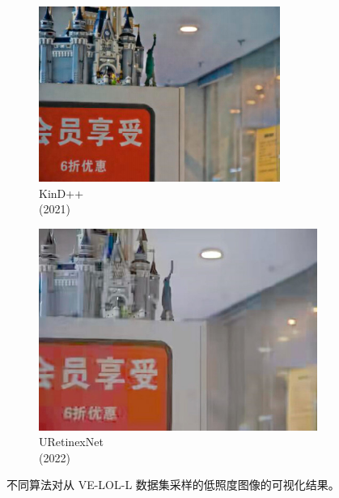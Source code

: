 \documentclass[a4paper, 10pt]{article}
\begin{document}
\begin{figure}[htbp]
\begin{subfigure}{0.17\columnwidth}
			\includegraphics[width=\linewidth]{picture/LLIE/VE-LOL-L/KinD++}
			\captionsetup{font=scriptsize}
			\caption*{KinD++ \\ (2021)}
			\label{fig: KinD++}	
		\end{subfigure}
		\begin{subfigure}{0.17\columnwidth}
			\includegraphics[width=\linewidth]{picture/LLIE/VE-LOL-L/URetinexNet}
			\captionsetup{font=scriptsize}
			\caption*{URetinexNet \\ (2022)}
			\label{fig: URetinexNet}	
		\end{subfigure}
		\caption{
			\label{fig: VE-LOL-L Visual} 
			不同算法对从 VE-LOL-L 数据集采样的低照度图像的可视化结果。 
		}
	\end{figure}
	
\end{document}
